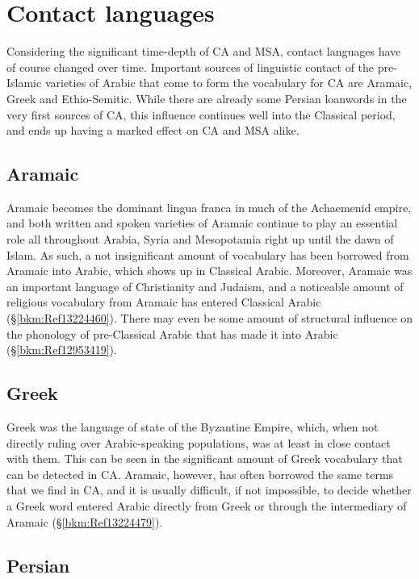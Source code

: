 \documentclass[output=paper]{langsci/langscibook}
\begin{document}
\section{Contact languages}


Considering the significant time-depth of CA and MSA, contact languages have of course changed over time. Important sources of linguistic contact of the pre-Islamic varieties of Arabic that come to form the vocabulary for CA are Aramaic, Greek and Ethio-Semitic. While there are already some Persian loanwords in the very first sources of CA, this influence continues well into the Classical period, and ends up having a marked effect on CA and MSA alike.

\subsection{Aramaic}
Aramaic becomes the dominant lingua franca in much of the Achaemenid empire, and both written and spoken varieties of Aramaic continue to play an essential role all throughout Arabia, Syria and Mesopotamia right up until the dawn of Islam. As such, a not insignificant amount of vocabulary has been borrowed from Aramaic into Arabic, which shows up in Classical Arabic. Moreover, Aramaic was an important language of Christianity and Judaism, and a noticeable amount of religious vocabulary from Aramaic has entered Classical Arabic (§\ref{bkm:Ref13224460}). There may even be some amount of structural influence on the phonology of pre-Classical Arabic that has made it into Arabic (§\ref{bkm:Ref12953419}).

\subsection{Greek}

Greek was the language of state of the Byzantine Empire, which, when not directly ruling over Arabic-speaking populations, was at least in close contact with them. This can be seen in the significant amount of Greek vocabulary that can be detected in CA. Aramaic, however, has often borrowed the same terms that we find in CA, and it is usually difficult, if not impossible, to decide whether a Greek word entered Arabic directly from Greek or through the intermediary of Aramaic (§\ref{bkm:Ref13224479}).

\subsection{Persian}
\end{document}
